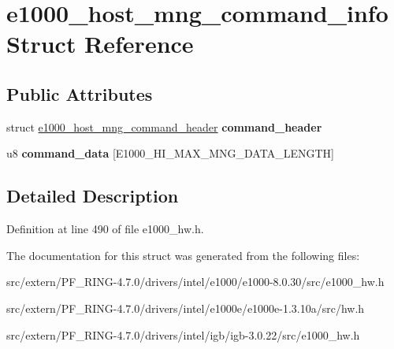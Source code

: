 \hypertarget{structe1000__host__mng__command__info}{
\section{e1000\_\-host\_\-mng\_\-command\_\-info Struct Reference}
\label{structe1000__host__mng__command__info}
}
\subsection*{Public Attributes}
\begin{DoxyCompactItemize}
\item 
\hypertarget{structe1000__host__mng__command__info_a279c972944baa36b09e22d2242d386a3}{
struct \hyperlink{structe1000__host__mng__command__header}{e1000\_\-host\_\-mng\_\-command\_\-header} {\bfseries command\_\-header}}
\label{structe1000__host__mng__command__info_a279c972944baa36b09e22d2242d386a3}

\item 
\hypertarget{structe1000__host__mng__command__info_ae7512e99527c5cc19964d8364f230680}{
u8 {\bfseries command\_\-data} \mbox{[}E1000\_\-HI\_\-MAX\_\-MNG\_\-DATA\_\-LENGTH\mbox{]}}
\label{structe1000__host__mng__command__info_ae7512e99527c5cc19964d8364f230680}

\end{DoxyCompactItemize}


\subsection{Detailed Description}


Definition at line 490 of file e1000\_\-hw.h.



The documentation for this struct was generated from the following files:\begin{DoxyCompactItemize}
\item 
src/extern/PF\_\-RING-\/4.7.0/drivers/intel/e1000/e1000-\/8.0.30/src/e1000\_\-hw.h\item 
src/extern/PF\_\-RING-\/4.7.0/drivers/intel/e1000e/e1000e-\/1.3.10a/src/hw.h\item 
src/extern/PF\_\-RING-\/4.7.0/drivers/intel/igb/igb-\/3.0.22/src/e1000\_\-hw.h\end{DoxyCompactItemize}
